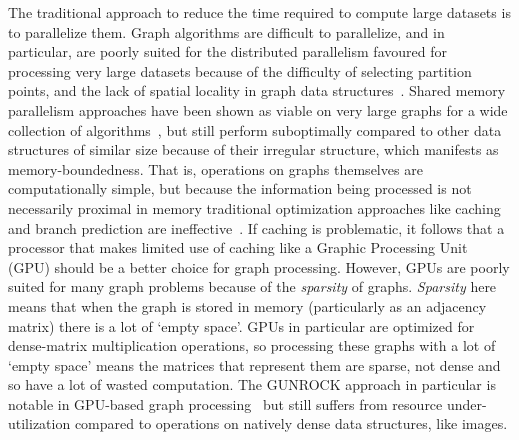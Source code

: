 {The traditional approach to reduce the time required to compute large datasets is to parallelize them. 
Graph algorithms are difficult to parallelize, and in particular, are poorly suited for the distributed parallelism favoured for processing very large datasets because of the difficulty of selecting partition points, and the lack of spatial locality in graph data structures~\cite{Beamer2015}.
Shared memory parallelism approaches have been shown as viable on very large graphs for a wide collection of algorithms~\cite{Dhulipala2021}, but still perform suboptimally compared to other data structures of similar size because of their irregular structure, which manifests as memory-boundedness.
That is, operations on graphs themselves are computationally simple, but because the information being processed is not necessarily proximal in memory traditional optimization approaches like caching and branch prediction are ineffective~\cite{Aananthakrishnan2020}.
If caching is problematic, it follows that a processor that makes limited use of caching like a Graphic Processing Unit (GPU) should be a better choice for graph processing. 
However, GPUs are poorly suited for many graph problems because of the \textit{sparsity} of graphs.
\textit{Sparsity} here means that when the graph is stored in memory (particularly as an adjacency matrix) there is a lot of `empty space'. 
GPUs in particular are optimized for dense-matrix multiplication operations, so processing these graphs with a lot of `empty space' means the matrices that represent them are sparse, not dense and so have a lot of wasted computation.
The GUNROCK approach in particular is notable in GPU-based graph processing~\cite{Wang2016} but still suffers from resource under-utilization compared to operations on natively dense data structures, like images. 

}
